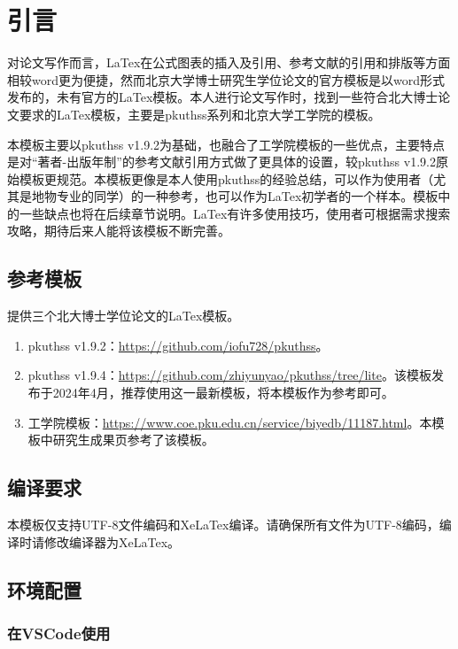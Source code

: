 \chapter{引言}
\label{chap:introduction}

对论文写作而言，LaTex在公式图表的插入及引用、参考文献的引用和排版等方面相较word更为便捷，然而北京大学博士研究生学位论文的官方模板是以word形式发布的，未有官方的LaTex模板。本人进行论文写作时，找到一些符合北大博士论文要求的LaTex模板，主要是pkuthss系列和北京大学工学院的模板。

本模板主要以pkuthss v1.9.2为基础，也融合了工学院模板的一些优点，主要特点是对“著者-出版年制”的参考文献引用方式做了更具体的设置，较pkuthss v1.9.2原始模板更规范。本模板更像是本人使用pkuthss的经验总结，可以作为使用者（尤其是地物专业的同学）的一种参考，也可以作为LaTex初学者的一个样本。模板中的一些缺点也将在后续章节说明。LaTex有许多使用技巧，使用者可根据需求搜索攻略，期待后来人能将该模板不断完善。

\section{参考模板}

提供三个北大博士学位论文的LaTex模板。

\begin{enumerate}[itemindent=0.3em]     %
    \item pkuthss v1.9.2：\url{https://github.com/iofu728/pkuthss}。
    \item pkuthss v1.9.4：\url{https://github.com/zhiyunyao/pkuthss/tree/lite}。该模板发布于2024年4月，推荐使用这一最新模板，将本模板作为参考即可。
    \item 工学院模板：\url{https://www.coe.pku.edu.cn/service/biyedb/11187.html}。本模板中研究生成果页参考了该模板。
\end{enumerate}

\section{编译要求}

本模板仅支持UTF-8文件编码和XeLaTex编译。请确保所有文件为UTF-8编码，编译时请修改编译器为XeLaTex。

\section{环境配置}

\subsection{在VSCode使用}

